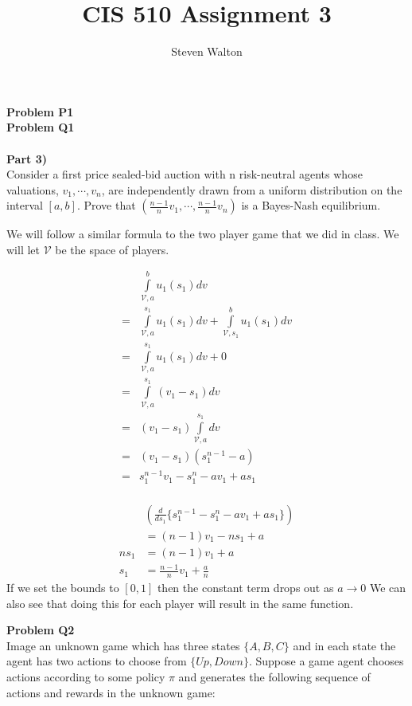\documentclass[12pt,letter]{article}
\newcommand{\problem}[1]{\vspace{3mm}\Large\textbf{{Problem {#1}\vspace{3mm}}}\normalsize\\}
\newcommand{\ppart}[1]{\vspace{2mm}\large\textbf{\\Part {#1})\vspace{2mm}}\normalsize\\}
\begin{document}
\title{CIS 510 Assignment 3}
\author{Steven Walton}
\maketitle
\problem{P1}

\problem{Q1}
\ppart{3}
Consider a first price sealed-bid auction with n risk-neutral agents whose 
valuations, $v_1,\cdots,v_n$, are independently drawn from a uniform distribution
on the interval $[a,b]$. Prove that $\left(\frac{n-1}{n}v_1,\cdots,\frac{n-1}{n}v_n\right)$ is a Bayes-Nash equilibrium.

We will follow a similar formula to the two player game that we did in class.
We will let $\mathcal{V}$ be the space of players.

\begin{minipage}{\textwidth}
\begin{multicols}{2}
\begin{align*}
    &\int\limits_{\mathcal{V},a}^b u_1(s_1) dv\\
    =&\int\limits_{\mathcal{V},a}^{s_1} u_1(s_1)dv + \int\limits_{\mathcal{V},s_1}^b u_1(s_1)dv\\
    =&\int\limits_{\mathcal{V},a}^{s_1} u_1(s_1)dv + 0\\
    =&\int\limits_{\mathcal{V},a}^{s_1} (v_1 - s_1)dv\\
    =&(v_1 - s_1) \int\limits_{\mathcal{V},a}^{s_1}dv\\
    =&(v_1 - s_1)(s_1^{n-1} - a)\\
    =&s_1^{n-1}v_1 - s_1^{n} -av_1 + as_1\\
\end{align*}

\begin{align*}
    &\left(\frac{d}{ds_1}\{s_1^{n-1}-s_1^{n}-av_1+as_1\}\right)\\
    &= (n-1)v_1 - ns_1 + a\\
    ns_1 &= (n-1)v_1 +a \\
    s_1 &= \frac{n-1}{n}v_1 + \frac{a}{n}
\end{align*}
If we set the bounds to $[0,1]$ then the constant term drops out as $a\to 0$
We can also see that doing this for each player will result in the same function.
\end{multicols}
\end{minipage}


\problem{Q2}
Image an unknown game which has three states $\{A,B,C\}$ and in each state the
agent has two actions to choose from $\{Up,Down\}$. Suppose a game agent chooses
actions according to some policy $\pi$ and generates the following sequence of
actions and rewards in the unknown game:
\end{document}
